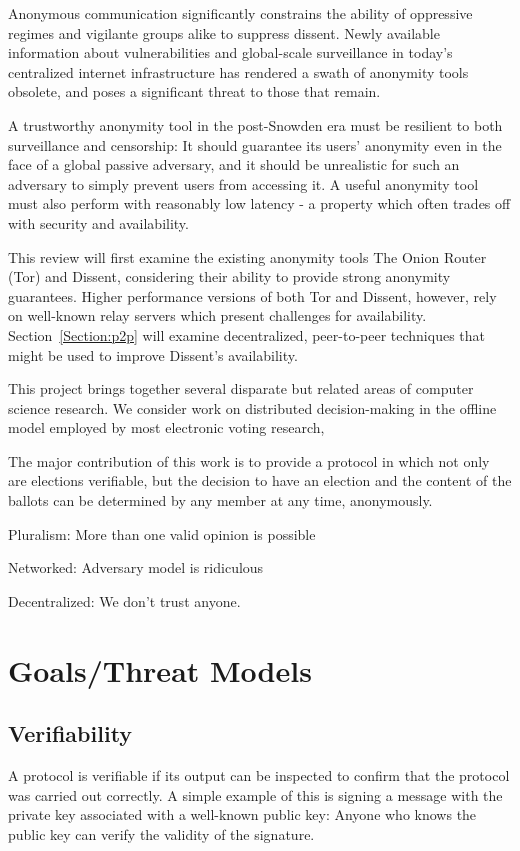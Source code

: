 Anonymous communication significantly constrains the ability of oppressive
regimes and vigilante groups alike to suppress dissent. Newly available
information about vulnerabilities and global-scale surveillance in today's
centralized internet infrastructure has rendered a swath of anonymity tools
obsolete, and poses a significant threat to those that remain.

A trustworthy anonymity tool in the post-Snowden era must be resilient to both
surveillance and censorship: It should guarantee its users' anonymity even in
the face of a global passive adversary, and it should be unrealistic for such an
adversary to simply prevent users from accessing it. A useful anonymity tool
must also perform with reasonably low latency - a property which often trades
off with security and availability.

This review will first examine the existing anonymity tools The Onion Router
(Tor) and Dissent, considering their ability to provide strong anonymity
guarantees. Higher performance versions of both Tor and Dissent, however, rely
on well-known relay servers which present challenges for availability.
Section~\ref{Section:p2p} will examine decentralized, peer-to-peer techniques
that might be used to improve Dissent's availability.

This project brings together several disparate but related areas of computer
science research. We consider work on distributed decision-making in the offline
model employed by most electronic voting research,

The major contribution of this work is to provide a protocol in which not only
are elections verifiable, but the decision to have an election and the content
of the ballots can be determined by any member at any time,
anonymously.

Pluralism: More than one valid opinion is possible

Networked: Adversary model is ridiculous

Decentralized: We don't trust anyone.

\section{Goals/Threat Models}
\subsection{Verifiability}
  A protocol is verifiable if its output can be
  inspected to confirm that the protocol was carried out correctly. A simple
  example of this is signing a message with the private key associated with a
  well-known public key: Anyone who knows the public key can verify the
  validity of the signature.

